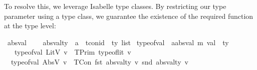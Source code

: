 To resolve this, we leverage Isabelle type classes.
By restricting our type parameter  using a type class,
we guarantee the existence of the required function at the type level:


\begin{isabellebody}\isanewline
\isamarkupfalse%
\ absval\ {\isacharequal}{\kern0pt}\isanewline
\ \ \ absval{\isacharunderscore}{\kern0pt}ty\ {\isacharcolon}{\kern0pt}{\isacharcolon}{\kern0pt}\ {\isachardoublequoteopen}{\isacharprime}{\kern0pt}a\ {\isasymRightarrow}\ {\isacharparenleft}{\kern0pt}tcon{\isacharunderscore}{\kern0pt}id\ {\isasymtimes}\ ty\ list{\isacharparenright}{\kern0pt}{\isachardoublequoteclose}\isanewline
\isanewline
\isamarkupfalse%
\ type{\isacharunderscore}{\kern0pt}of{\isacharunderscore}{\kern0pt}val\ {\isacharcolon}{\kern0pt}{\isacharcolon}{\kern0pt}\ {\isachardoublequoteopen}{\isacharparenleft}{\kern0pt}{\isacharprime}{\kern0pt}a{\isacharcolon}{\kern0pt}{\isacharcolon}{\kern0pt}absval{\isacharcomma}{\kern0pt}\ {\isacharprime}{\kern0pt}m{\isacharparenright}{\kern0pt}\ val\ {\isasymRightarrow}\ ty{\isachardoublequoteclose}\isanewline
\ \ \isanewline
\ \ \ {\isachardoublequoteopen}type{\isacharunderscore}{\kern0pt}of{\isacharunderscore}{\kern0pt}val\ {\isacharparenleft}{\kern0pt}LitV\ v{\isacharparenright}{\kern0pt}\ {\isacharequal}{\kern0pt}\ TPrim\ {\isacharparenleft}{\kern0pt}type{\isacharunderscore}{\kern0pt}of{\isacharunderscore}{\kern0pt}lit\ v{\isacharparenright}{\kern0pt}{\isachardoublequoteclose}\isanewline
\ {\isacharbar}{\kern0pt}\ {\isachardoublequoteopen}type{\isacharunderscore}{\kern0pt}of{\isacharunderscore}{\kern0pt}val\ {\isacharparenleft}{\kern0pt}AbsV\ v{\isacharparenright}{\kern0pt}\ {\isacharequal}{\kern0pt}\ TCon\ {\isacharparenleft}{\kern0pt}fst\ {\isacharparenleft}{\kern0pt}absval{\isacharunderscore}{\kern0pt}ty\ v{\isacharparenright}{\kern0pt}{\isacharparenright}{\kern0pt}\ {\isacharparenleft}{\kern0pt}snd\ {\isacharparenleft}{\kern0pt}absval{\isacharunderscore}{\kern0pt}ty\ v{\isacharparenright}{\kern0pt}{\isacharparenright}{\kern0pt}{\isachardoublequoteclose}\isanewline
\end{isabellebody}



